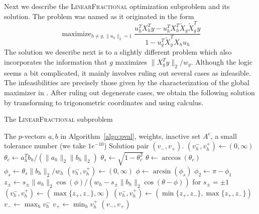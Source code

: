 \documentclass{imsart}
\newcommand{\maximize}{\mathop{\mathrm{maximize}}}
\newcommand{\todo}{\textcolor{red}{\textbf{To do: }}}
\newcommand{\norm}[1]{\lVert #1 \rVert}
\begin{document}
Next we describe the \textsc{LinearFractional} optimization
subproblem and its solution.
The problem was named as it originated in the form
\[
\maximize_{h \neq g, \norm{u_h}_2 = 1}
\frac{u_h^TX_h^Ty - u_h^TX_h^T\tilde X_g \tilde X_g^Ty}
{1 - u_g^T \tilde X_g^TX_hu_h}
\]
The solution we describe next is to a slightly different problem which
also incorporates the information that $g$ maximizes $\norm{X_g^Ty}_2/w_g$.
Although the logic seems a bit complicated, it mainly involves ruling out
several cases as infeasible. The infeasibilities are precisely those given
by the characterization of the global maximizer in \cite{tests:adaptive}.
After ruling out degenerate cases, we obtain the following solution
by transforming to trigonometric coordinates and using calculus.

\begin{algorithm}
 \caption{The \textsc{LinearFractional} subproblem}
 \label{algo:linfrac}
 \begin{algorithmic}
   \REQUIRE The $p$-vectors $a, b$ in Algorithm~\ref{algo:pval}, weights, inactive set $A^c$, a small tolerance number
(we take $1e^{-10}$)
   \ENSURE Solution pair $(v_-, v_+)$.
     \IF{$\norm{b_h}_2 == 0$ or $\norm{a_h}_2/\norm{b_h}_2 < \text{tol}$}
       \STATE $(v^-_h, v^+_h) \gets (0, \infty)$
     \ELSE
       \STATE $\theta_c \gets a_h^Tb_h/(\norm{a_h}_2 \norm{b_h}_2)$
       \STATE $\theta_s \gets \sqrt{1-\theta_c^2}$
       \STATE $\theta \gets \arccos (\theta_c)$
       \STATE $\phi_s \gets \theta_s \norm{b_h}_2 / w_h$
         \STATE $(v^-_h, v^+_h) \gets (0, \infty)$
       \ELSE
         \STATE $\phi \gets \arcsin(\phi_s)$
         \STATE $\phi_2 \gets \pi - \phi_1$
         \STATE $z_\pm \gets s_\pm \norm{a_h}_2 \cos(\phi) /(w_h - s_\pm \norm{b_h}_2 \cos(\theta - \phi))$ for $s_\pm = \pm 1$
         \IF{$\norm{b_h}_2 < w_h$}
           \STATE $(v_h^-, v_h^+) \gets (\max \{ z_+, z_- \}, \infty)$
         \ELSE
           \STATE $(v_h^-, v_h^+) \gets (\min \{ z_+, z_- \}, \max \{ z_+, z_- \})$
         \ENDIF
       \ENDIF
     \ENDIF
   \ENDFOR
   \STATE $v_- \gets \max_h v_h^-$
   \STATE $v_+ \gets \min_h v_h^+$
   \RETURN $(v_-, v_+)$
 \end{algorithmic}
\end{algorithm}


\end{document}
